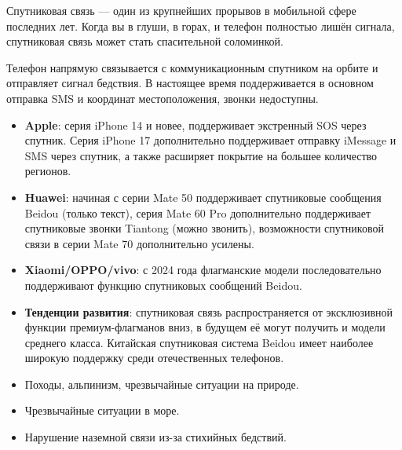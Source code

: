 


Спутниковая связь — один из крупнейших прорывов в мобильной сфере последних лет. Когда вы в глуши, в горах, и телефон полностью лишён сигнала, спутниковая связь может стать спасительной соломинкой.


Телефон напрямую связывается с коммуникационным спутником на орбите и отправляет сигнал бедствия. В настоящее время поддерживается в основном отправка SMS и координат местоположения, звонки недоступны.


\begin{itemize}
  \item \textbf{Apple}: серия iPhone 14 и новее, поддерживает экстренный SOS через спутник. Серия iPhone 17 дополнительно поддерживает отправку iMessage и SMS через спутник, а также расширяет покрытие на большее количество регионов.
  \item \textbf{Huawei}: начиная с серии Mate 50 поддерживает спутниковые сообщения Beidou (только текст), серия Mate 60 Pro дополнительно поддерживает спутниковые звонки Tiantong (можно звонить), возможности спутниковой связи в серии Mate 70 дополнительно усилены.
  \item \textbf{Xiaomi/OPPO/vivo}: с 2024 года флагманские модели последовательно поддерживают функцию спутниковых сообщений Beidou.
  \item \textbf{Тенденции развития}: спутниковая связь распространяется от эксклюзивной функции премиум-флагманов вниз, в будущем её могут получить и модели среднего класса. Китайская спутниковая система Beidou имеет наиболее широкую поддержку среди отечественных телефонов.
\end{itemize}


\begin{itemize}
  \item Походы, альпинизм, чрезвычайные ситуации на природе.
  \item Чрезвычайные ситуации в море.
  \item Нарушение наземной связи из-за стихийных бедствий.
\end{itemize}

